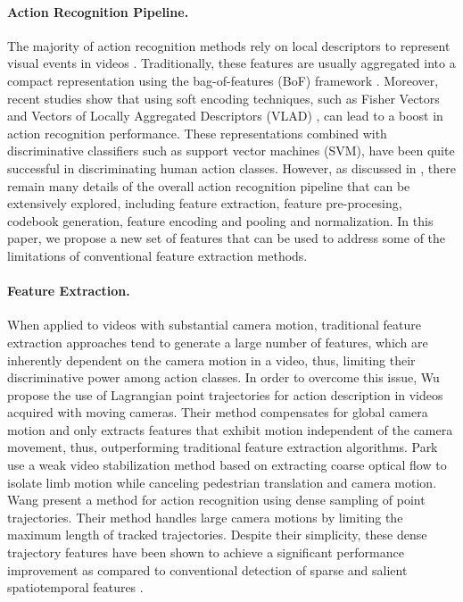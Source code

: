 \paragraph{\textbf{Action Recognition Pipeline.}} The majority of action recognition methods rely on local descriptors to represent visual events in videos \cite{laptev2005,dollar2005,wang2011}. Traditionally, these features are usually aggregated into a compact representation using the bag-of-features (BoF) framework \cite{laptev2008}. Moreover, recent studies show that using soft encoding techniques, such as  Fisher Vectors \cite{perronnin2010} and Vectors of Locally Aggregated Descriptors (VLAD) \cite{jegou2012}, can lead to a boost in action recognition performance. These representations combined with discriminative classifiers such as support vector machines (SVM), have been quite successful in discriminating human action classes. However, as discussed in \cite{xwang2013}, there remain many details of the overall action recognition pipeline that can be extensively explored, including feature extraction, feature pre-procesing, codebook generation, feature encoding and pooling and normalization. In this paper, we propose a new set of features that can be used to address some of the limitations of conventional feature extraction methods.

\paragraph{\textbf{Feature Extraction.}} When applied to videos with substantial camera motion, traditional feature extraction approaches \cite{dollar2005, laptev2005} tend to generate a large number of features, which are inherently dependent on the camera motion in a video, thus, limiting their discriminative power among action classes. In order to overcome this issue, Wu \etal \cite{wu2011} propose the use of Lagrangian point trajectories for action description in videos acquired with moving cameras. Their method compensates for global camera motion and only extracts features that exhibit motion independent of the camera movement, thus, outperforming traditional feature extraction algorithms. Park \etal \cite{park2013} use a weak video stabilization method based on extracting coarse optical flow to isolate limb motion while canceling pedestrian translation and camera motion. Wang \etal \cite{wang2011} present a method for action recognition using dense sampling of point trajectories. Their method handles large camera motions by limiting the maximum length of tracked trajectories. Despite their simplicity, these dense trajectory features have been shown to achieve a significant performance improvement as compared to conventional detection of sparse and salient spatiotemporal features \cite{laptev2005}.

